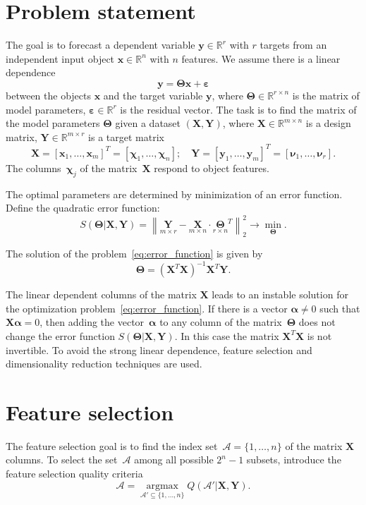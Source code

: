\documentclass[12pt,twoside]{article}
\newcommand{\bx}{\mathbf{x}}
\newcommand{\by}{\mathbf{y}}
\newcommand{\bY}{\mathbf{Y}}
\newcommand{\bX}{\mathbf{X}}
\newcommand{\bbR}{\mathbb{R}}
\newcommand{\cA}{\mathcal{A}}
\newcommand{\bchi}{\boldsymbol{\chi}}
\newcommand{\bnu}{\boldsymbol{\nu}}
\newcommand{\bTheta}{\boldsymbol{\Theta}}
\newcommand{\argmax}{\mathop{\arg \max}\limits}
\begin{document}
\linenumbers
\section{Problem statement}
The goal is to forecast a dependent variable $\by \in \bbR^r$ with $r$ targets from an independent input object $\bx \in \bbR^n$ with $n$ features.
We assume there is a linear dependence
\begin{equation}
	\by = \bTheta \bx+ \boldsymbol{\varepsilon}
	\label{eq:model}
\end{equation}
between the objects $\bx$ and the target variable $\by$,
where $\bTheta \in \bbR^{r \times n}$ is the matrix of model parameters, $\boldsymbol{\varepsilon} \in \bbR^{r}$ is the residual vector.
The task is to find the matrix of the model parameters $\bTheta$ given a dataset $\left( \bX, \bY \right)$, where $\bX \in \bbR^{m \times n}$ is a design matrix, $\bY \in \bbR^{m \times r}$ is a target matrix
\[
	\bX = [\bx_1, \dots, \bx_m]^T =  [\bchi_1, \dots, \bchi_n]; \quad \bY = [\by_1, \dots, \by_m]^T =  [\bnu_1, \dots, \bnu_r].
\]
The columns~$\bchi_j$ of the matrix~$\bX$ respond to object features.

The optimal parameters are determined by minimization of an error function.
Define the quadratic error function:
\begin{equation}
	S(\bTheta | \bX, \bY) = {\left\| \underset{m \times r}{\mathbf{Y}}  - \underset{m \times n}{\bX} \cdot \underset{r \times n}{\bTheta}^T \right\| }_2^2 \rightarrow\min_{\bTheta}.
\label{eq:error_function}
\end{equation}

 The solution of the problem~\eqref{eq:error_function} is given by
 \[
 	\bTheta = (\bX^T \bX)^{-1} \bX^T \bY.
 \]

 The linear dependent columns of the matrix $\bX$ leads to an instable solution for the optimization problem~\eqref{eq:error_function}.
 If there is a vector $\boldsymbol{\alpha} \neq 0$ such that $\bX \boldsymbol{\alpha}= 0$, then adding the vector~$\boldsymbol{\alpha}$ to any column of the matrix~$\bTheta$ does not change the error function $S(\bTheta | \bX, \bY)$.
 In this case the matrix $\bX^T \bX$ is not invertible.
 To avoid the strong linear dependence, feature selection and dimensionality reduction techniques are used.

 \section{Feature selection}
 The feature selection goal is to find the index set~$\cA = \{1, \dots, n\}$ of the matrix $\bX$ columns. To select the set~$\cA$ among all possible $2^n - 1$ subsets, introduce the feature selection quality criteria
\begin{equation}
	\cA = \argmax_{\cA' \subseteq \{1, \dots, n\}} Q(\cA' | \bX, \bY).
	\label{eq:subset_selection}
\end{equation}
\end{document}
